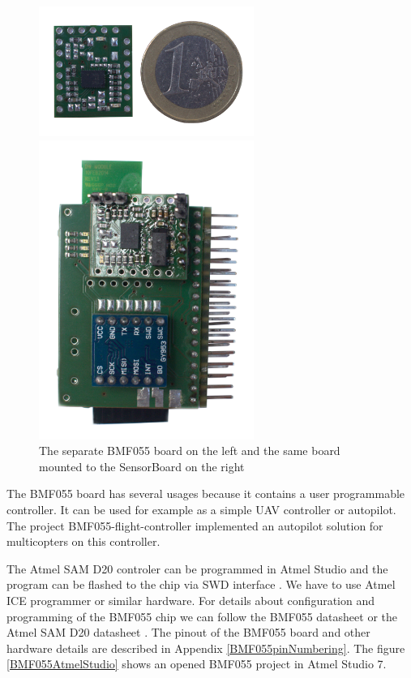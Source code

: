 \begin{figure}
    \centering
    \caption{The separate BMF055 board on the left and the same board mounted to the SensorBoard on the right}
    \label{BMF055photo}
    \begin{minipage}[c]{.45\textwidth}
        \includegraphics[width=7cm]{img/BMF055.jpg}
    \end{minipage}
    \quad\vrule{}
    \begin{minipage}[c]{.45\textwidth}
        \includegraphics[width=7cm]{img/HWassembledNoCoin.jpg}
    \end{minipage}
\end{figure}

The BMF055 board has several usages because it contains a user programmable controller. It can be used for example as a simple UAV controller or autopilot. The project BMF055-flight-controller \cite{BMF055flightController} implemented an autopilot solution for multicopters on this controller.

The Atmel SAM D20 controler \cite{atmel:samd20} can be programmed in Atmel Studio \cite{AtmelStudio} and the program can be flashed to the chip via \ac{SWD} interface \cite{SWDinterface}. We have to use Atmel ICE programmer \cite{AtmelICE} or similar hardware. For details about configuration and programming of the BMF055 chip we can follow the BMF055 datasheet \cite{bosch:BMF055} or the Atmel SAM D20 datasheet \cite{atmel:samd20}. The pinout of the BMF055 board and other hardware details are described in Appendix \ref{BMF055pinNumbering}. The figure \ref{BMF055AtmelStudio} shows an opened BMF055 project in Atmel Studio 7.

